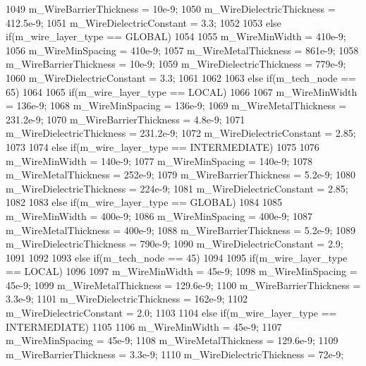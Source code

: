 \begin{DoxyCode}
{{{1049             m_WireBarrierThickness    = 10e-9;
1050             m_WireDielectricThickness = 412.5e-9;
1051             m_WireDielectricConstant  = 3.3;
1052         }
1053         else if(m_wire_layer_type == GLOBAL)
1054         {
1055             m_WireMinWidth            = 410e-9;
1056             m_WireMinSpacing          = 410e-9;
1057             m_WireMetalThickness      = 861e-9;
1058             m_WireBarrierThickness    = 10e-9;
1059             m_WireDielectricThickness = 779e-9;
1060             m_WireDielectricConstant  = 3.3;
1061         }
1062     }
1063     else if(m_tech_node == 65)
1064     {
1065         if(m_wire_layer_type == LOCAL)
1066         {
1067             m_WireMinWidth                      = 136e-9;
1068             m_WireMinSpacing                  = 136e-9;
1069             m_WireMetalThickness            = 231.2e-9;
1070             m_WireBarrierThickness        = 4.8e-9;
1071             m_WireDielectricThickness   = 231.2e-9;
1072             m_WireDielectricConstant    = 2.85;
1073         }
1074         else if(m_wire_layer_type == INTERMEDIATE)
1075         {
1076             m_WireMinWidth            = 140e-9;
1077             m_WireMinSpacing          = 140e-9;
1078             m_WireMetalThickness      = 252e-9;
1079             m_WireBarrierThickness    = 5.2e-9;
1080             m_WireDielectricThickness = 224e-9;
1081             m_WireDielectricConstant  = 2.85;
1082         }
1083         else if(m_wire_layer_type == GLOBAL)
1084         {
1085             m_WireMinWidth            = 400e-9;
1086             m_WireMinSpacing          = 400e-9;
1087             m_WireMetalThickness      = 400e-9;
1088             m_WireBarrierThickness    = 5.2e-9;
1089             m_WireDielectricThickness = 790e-9;
1090             m_WireDielectricConstant  = 2.9;
1091         }
1092     }
1093     else if(m_tech_node == 45)
1094     {
1095         if(m_wire_layer_type == LOCAL)
1096         {
1097             m_WireMinWidth            = 45e-9;
1098             m_WireMinSpacing          = 45e-9;
1099             m_WireMetalThickness      = 129.6e-9;
1100             m_WireBarrierThickness    = 3.3e-9;
1101             m_WireDielectricThickness = 162e-9;
1102             m_WireDielectricConstant  = 2.0;
1103         }
1104         else if(m_wire_layer_type == INTERMEDIATE)
1105         {
1106             m_WireMinWidth            = 45e-9;
1107             m_WireMinSpacing          = 45e-9;
1108             m_WireMetalThickness      = 129.6e-9;
1109             m_WireBarrierThickness    = 3.3e-9;
1110             m_WireDielectricThickness = 72e-9;
}}}
\end{DoxyCode}
